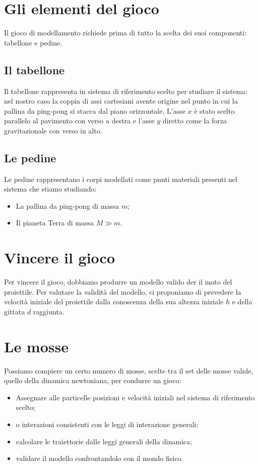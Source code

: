 \documentclass{article}
\begin{document}
\section{Gli elementi del gioco}
Il gioco di modellamento richiede prima di tutto la scelta
dei suoi componenti: tabellone e pedine.

\subsection{Il tabellone}
Il tabellone rappresenta in sistema di riferimento scelto per studiare
il sistema: nel nostro caso la coppia di assi cartesiani avente
origine nel punto in cui la pallina da ping-pong si stacca dal
piano orizzontale. L'asse $x$ è stato scelto parallelo al pavimento
con verso a destra e l'asse $y$ diretto come la forza gravitazionale
con verso in alto.

\subsection{Le pedine}
Le pedine rappresentano i corpi modellati come punti materiali
presenti nel sistema che stiamo studiando:

\begin{itemize}
\item La pallina da ping-pong di massa $m$;
\item Il pianeta Terra di massa $M \gg m$.
\end{itemize}

\section{Vincere il gioco}
Per vincere il gioco, dobbiamo produrre un modello valido
der il moto del proiettile. Per valutare la validità
del modello, ci proponiamo di prevedere la velocità iniziale
del proiettile dalla conoscenza della sua altezza iniziale
$h$ e della gittata $d$ raggiunta.

\section{Le mosse}
Possiamo compiere un certo numero di mosse, scelte tra il set
delle mosse valide, quello della dinamica newtoniana, per
condurre un gioco:

\begin{itemize}
\item Assegnare alle particelle posizioni e velocità iniziali nel sistema di riferimento scelto;
\item o interazioni consistenti con le leggi di interazione generali;
\item calcolare le traiettorie dalle leggi generali della dinamica;
\item validare il modello confrontandolo con il mondo fisico.
\end{itemize}
\end{document}
